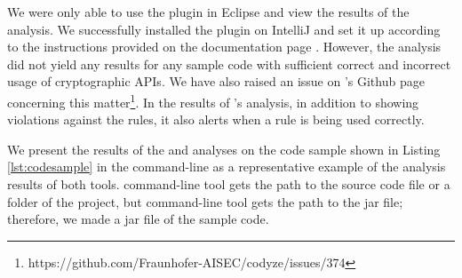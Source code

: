 We were only able to use the \codyze{} plugin in Eclipse and view the results of the analysis. We successfully installed the \codyze{} plugin on IntelliJ and set it up according to the instructions provided on the \codyze{} documentation page \cite{cod}. However, the analysis did not yield any results for any sample code with sufficient correct and incorrect usage of cryptographic APIs. We have also raised an issue on \codyze's Github page concerning this matter\footnote{https://github.com/Fraunhofer-AISEC/codyze/issues/374}.
In the results of \codyze's analysis, in addition to showing violations against the rules, it also alerts when a rule is being used correctly.

We present the results of the \codyze{} and \cognicryptsast{} analyses on the code sample shown in Listing \ref{lst:codesample} in the command-line as a representative example of the analysis results of both tools. \codyze{} command-line tool gets the path to the source code file or a folder of the project, but \cognicryptsast{} command-line tool gets the path to the jar file; therefore, we made a jar file of the sample code.

